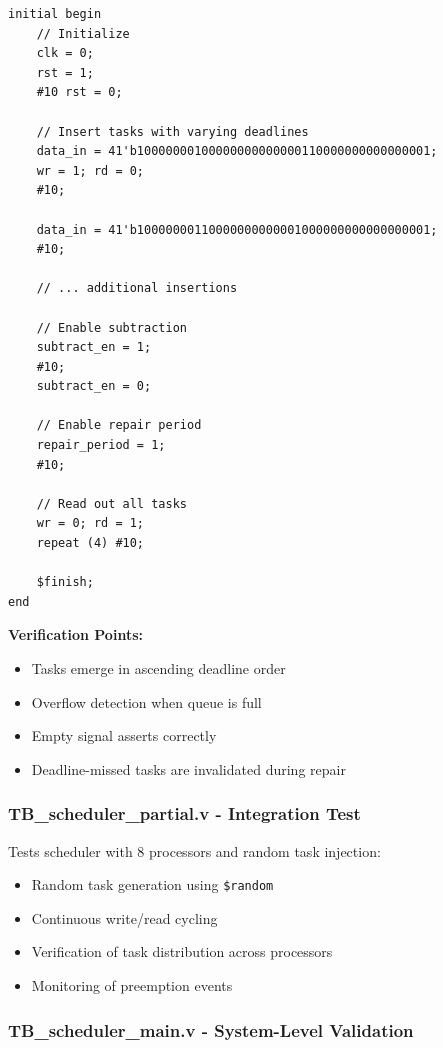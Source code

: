 \documentclass[12pt,a4paper]{article}
\begin{document}
\begin{lstlisting}[style=verilog, caption={Insertion Block Test Sequence}]
initial begin
    // Initialize
    clk = 0;
    rst = 1;
    #10 rst = 0;

    // Insert tasks with varying deadlines
    data_in = 41'b10000000100000000000000110000000000000001;
    wr = 1; rd = 0;
    #10;

    data_in = 41'b10000000110000000000001000000000000000001;
    #10;

    // ... additional insertions

    // Enable subtraction
    subtract_en = 1;
    #10;
    subtract_en = 0;

    // Enable repair period
    repair_period = 1;
    #10;

    // Read out all tasks
    wr = 0; rd = 1;
    repeat (4) #10;

    $finish;
end
\end{lstlisting}

\textbf{Verification Points:}
\begin{itemize}
    \item Tasks emerge in ascending deadline order
    \item Overflow detection when queue is full
    \item Empty signal asserts correctly
    \item Deadline-missed tasks are invalidated during repair
\end{itemize}

\subsubsection{TB\_scheduler\_partial.v - Integration Test}

Tests scheduler with 8 processors and random task injection:

\begin{itemize}
    \item Random task generation using \texttt{\$random}
    \item Continuous write/read cycling
    \item Verification of task distribution across processors
    \item Monitoring of preemption events
\end{itemize}

\subsubsection{TB\_scheduler\_main.v - System-Level Validation}
\end{document}

